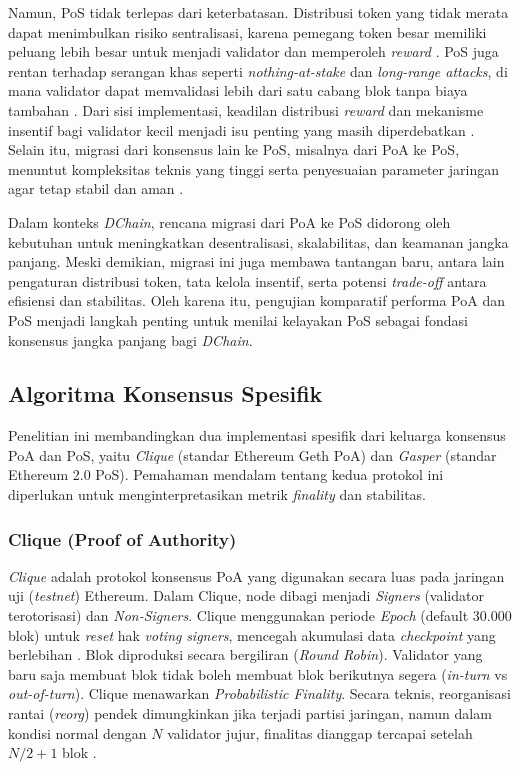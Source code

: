 Namun, PoS tidak terlepas dari keterbatasan. Distribusi token yang tidak merata dapat menimbulkan risiko sentralisasi, karena pemegang token besar memiliki peluang lebih besar untuk menjadi validator dan memperoleh \textit{reward} \cite{zhao2023, li2023, nguyen2019}. PoS juga rentan terhadap serangan khas seperti \textit{nothing-at-stake} dan \textit{long-range attacks}, di mana validator dapat memvalidasi lebih dari satu cabang blok tanpa biaya tambahan \cite{deirmentzoglou2019, li2020, feng2023}. Dari sisi implementasi, keadilan distribusi \textit{reward} dan mekanisme insentif bagi validator kecil menjadi isu penting yang masih diperdebatkan \cite{li2023, nguyen2019}. Selain itu, migrasi dari konsensus lain ke PoS, misalnya dari PoA ke PoS, menuntut kompleksitas teknis yang tinggi serta penyesuaian parameter jaringan agar tetap stabil dan aman \cite{zhang2025, ge2022}.

Dalam konteks \textit{DChain}, rencana migrasi dari PoA ke PoS didorong oleh kebutuhan untuk meningkatkan desentralisasi, skalabilitas, dan keamanan jangka panjang. Meski demikian, migrasi ini juga membawa tantangan baru, antara lain pengaturan distribusi token, tata kelola insentif, serta potensi \textit{trade-off} antara efisiensi dan stabilitas. Oleh karena itu, pengujian komparatif performa PoA dan PoS menjadi langkah penting untuk menilai kelayakan PoS sebagai fondasi konsensus jangka panjang bagi \textit{DChain}.


\subsection{Algoritma Konsensus Spesifik}

Penelitian ini membandingkan dua implementasi spesifik dari keluarga konsensus PoA dan PoS, yaitu \textit{Clique} (standar Ethereum Geth PoA) dan \textit{Gasper} (standar Ethereum 2.0 PoS). Pemahaman mendalam tentang kedua protokol ini diperlukan untuk menginterpretasikan metrik \textit{finality} dan stabilitas.

\subsubsection{Clique (Proof of Authority)}
\textit{Clique} adalah protokol konsensus PoA yang digunakan secara luas pada jaringan uji (\textit{testnet}) Ethereum. Dalam Clique, node dibagi menjadi \textit{Signers} (validator terotorisasi) dan \textit{Non-Signers}. Clique menggunakan periode \textit{Epoch} (default 30.000 blok) untuk \textit{reset} hak \textit{voting} \textit{signers}, mencegah akumulasi data \textit{checkpoint} yang berlebihan \cite{eip225}. Blok diproduksi secara bergiliran (\textit{Round Robin}). Validator yang baru saja membuat blok tidak boleh membuat blok berikutnya segera (\textit{in-turn} vs \textit{out-of-turn}). Clique menawarkan \textit{Probabilistic Finality}. Secara teknis, reorganisasi rantai (\textit{reorg}) pendek dimungkinkan jika terjadi partisi jaringan, namun dalam kondisi normal dengan $N$ validator jujur, finalitas dianggap tercapai setelah $N/2 + 1$ blok \cite{eip225}.

